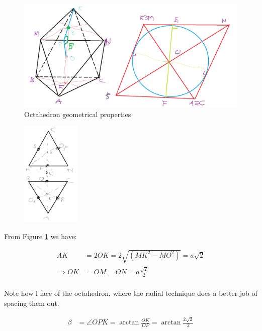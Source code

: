 \begin{figure}[h]
\centering
	\includegraphics[width=\textwidth]{image/octaGeo1.png}
%	
	\caption{Octahedron geometrical properties}
	\label{fig:octaGeo1}
\end{figure}


\begin{figure} %
    \centering
    \includegraphics[width=0.25\textwidth]{image/octaGeo2.png}
\end{figure}

\noindent From Figure \ref{fig:octaGeo1} we have:

\begin{equation*} 
\label{octa:eq0}
\begin{split}
AK & = 2OK = 2\sqrt{(MK^2-MO^2)} = a\sqrt{2}\\
\Rightarrow OK & = OM = ON = a\frac{\sqrt{2}}{2}\\
\end{split}
\end{equation*}

\noindent Note how l face of the octahedron, where the radial technique does a better job of spacing them out. 

\begin{equation*} 
\label{octa:eq2}
\begin{split}
\beta & = \angle OPK = \arctan{\frac{OK}{OP}} = \arctan{\frac{2\sqrt{2}}{2}}
\end{split}
\end{equation*}

